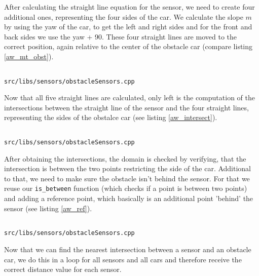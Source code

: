 \documentclass[paper=a4, fontsize=11pt]{scrreprt}
\begin{document}
After calculating the straight line equation for the sensor,
we need to create four additional ones, representing the four sides of the car.
We calculate the slope $m$ by using the yaw of the car, to get the left and right sides
and for the front and back sides we use the yaw + 90\degree{}.
These four straight lines are moved to the correct position,
again relative to the center of the obstacle car (compare listing \ref{aw_mt_obst}).

\begin{listing}[ht]
  \inputminted[firstline=130,linenos=true,lastline=152,gobble=3]{c++}{../../../simulators/speed-dreams/src/libs/sensors/obstacleSensors.cpp}
  \caption{\texttt{src/libs/sensors/obstacleSensors.cpp}}\label{aw_mt_obst}
\end{listing}

Now that all five straight lines are calculated,
only left is the computation of the intersections between the straight line of the sensor
and the four straight lines, representing the sides of the obstalce car (see listing \ref{aw_intersect}).

\begin{listing}[ht]
  \inputminted[firstline=154,linenos=true,lastline=164,gobble=3]{c++}{../../../simulators/speed-dreams/src/libs/sensors/obstacleSensors.cpp}
  \caption{\texttt{src/libs/sensors/obstacleSensors.cpp}}\label{aw_intersect}
\end{listing}

After obtaining the intersections, the domain is checked by verifying,
that the intersection is between the two points restricting the side of the car.
Additional to that, we need to make sure the obstacle isn't behind the sensor.
For that we reuse our \texttt{is\_between} function (which checks if a point is between two points) and adding a reference point,
which basically is an additional point 'behind' the sensor (see listing \ref{aw_ref}).

\begin{listing}[ht]
  \inputminted[firstline=98,linenos=true,lastline=99,gobble=2]{c++}{../../../simulators/speed-dreams/src/libs/sensors/obstacleSensors.cpp}
  \caption{\texttt{src/libs/sensors/obstacleSensors.cpp}}\label{aw_ref}
\end{listing}

Now that we can find the nearest intersection between a sensor and an obstacle car,
we do this in a loop for all sensors and all cars and therefore receive the correct distance value for each sensor.
\end{document}
